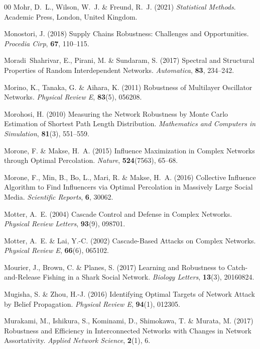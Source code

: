\documentclass{comnet-mod}
\begin{document}
\begin{thebibliography}{00}
Mohr, D.~L., Wilson, W.~J. {\&} Freund, R.~J. (2021) {\em {Statistical
  Methods}}.
{Academic Press}, {London, United Kingdom}.

Monostori, J. (2018)  {Supply Chains Robustness: {{Challenges}} and
  Opportunities}. {\em {Procedia Cirp}}, \textbf{67}, 110--115.

Moradi~Shahrivar, E., Pirani, M. {\&} Sundaram, S. (2017)  {Spectral and
  Structural Properties of Random Interdependent Networks}. {\em {Automatica}},
  \textbf{83}, 234--242.

Morino, K., Tanaka, G. {\&} Aihara, K. (2011)  {Robustness of Multilayer
  Oscillator Networks}. {\em {Physical Review E}}, \textbf{83}(5), 056208.

Morohosi, H. (2010)  {Measuring the Network Robustness by {{Monte Carlo}}
  Estimation of Shortest Path Length Distribution}. {\em {Mathematics and
  Computers in Simulation}}, \textbf{81}(3), 551--559.

Morone, F. {\&} Makse, H.~A. (2015)  {Influence Maximization in Complex
  Networks through Optimal Percolation}. {\em {Nature}}, \textbf{524}(7563),
  65--68.

Morone, F., Min, B., Bo, L., Mari, R. {\&} Makse, H.~A. (2016)  {Collective
  Influence Algorithm to Find Influencers via Optimal Percolation in Massively
  Large Social Media}. {\em {Scientific Reports}}, \textbf{6}, 30062.

Motter, A.~E. (2004)  {Cascade Control and Defense in Complex Networks}. {\em
  {Physical Review Letters}}, \textbf{93}(9), 098701.

Motter, A.~E. {\&} Lai, Y.-C. (2002)  {Cascade-Based Attacks on Complex
  Networks}. {\em {Physical Review E}}, \textbf{66}(6), 065102.

Mourier, J., Brown, C. {\&} Planes, S. (2017)  {Learning and Robustness to
  Catch-and-Release Fishing in a Shark Social Network}. {\em {Biology
  Letters}}, \textbf{13}(3), 20160824.

Mugisha, S. {\&} Zhou, H.-J. (2016)  {Identifying Optimal Targets of Network
  Attack by Belief Propagation}. {\em {Physical Review E}}, \textbf{94}(1),
  012305.

Murakami, M., Ishikura, S., Kominami, D., Shimokawa, T. {\&} Murata, M. (2017)
  {Robustness and Efficiency in Interconnected Networks with Changes in Network
  Assortativity}. {\em {Applied Network Science}}, \textbf{2}(1), 6.


\end{thebibliography}
\end{document}
